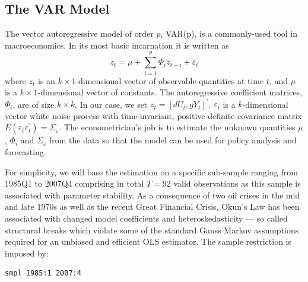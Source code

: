 \documentclass[11pt]{article}
\begin{document}
\subsection{The VAR Model}
The vector autoregressive model of order $ p $, VAR(p), is a commonly-used tool in macroeconomics. In its most basic incarnation it is written as
\begin{equation}
\label{eq:VAR}
	z_t = \mu + \sum_{i=1}^p \Phi_i z_{t-i} + \varepsilon_t
\end{equation}
where $z_t$ is an $k \times 1$-dimensional vector of observable quantities at time $t$, and $ \mu $ is a $k \times 1$-dimensional vector of constants. The autoregressive coefficient matrices, $\Phi_i$, are of size $ k\times k $. In our case, we set $z_t=\left[dU_t, gY_t\right]^\prime$. %
$\varepsilon_t$ is a $k$-dimensional vector white noise process with time-invariant, positive definite covariance matrix $ E(\varepsilon_t \varepsilon^\prime_t)=\Sigma_\varepsilon $. The econometrician's job is to estimate the unknown quantities $\mu$, $\Phi_i$ and $ \Sigma_\varepsilon $ from the data so that the model can be used for policy analysis and forecasting.


%

For simplicity, we will base the estimation on a specific sub-sample ranging from 1985Q1 to 2007Q4 comprising in total $ T=92 $ valid observations as this sample is associated with parameter stability. As a consequence of two oil crises in the mid and late 1970s as well as the recent Great Financial Crisis, Okun's Law has been associated with changed model coefficients and heteroskedasticity --- so called structural breaks which violate some of the standard Gauss Markov assumptions required for an unbiased and efficient OLS estimator. The sample restriction is imposed by:
\begin{Verbatim}[baselinestretch=0.75, fontsize=\small]
smpl 1985:1 2007:4
\end{Verbatim}
\end{document}
